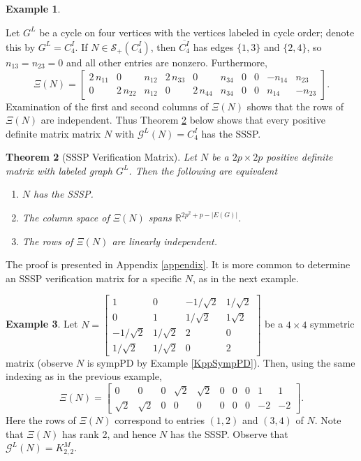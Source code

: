 \documentclass[12pt]{article}
\newtheorem{thm}{Theorem}[section]
\theoremstyle{definition}
\theoremstyle{definition}
\theoremstyle{definition}
\newtheorem{ex}[thm]{Example}
\numberwithin{figure}{section}
\numberwithin{equation}{section}
\newcommand{\G}{\mathcal{G}}
\newcommand{\symp}{\mathcal{S}_+}
\newcommand{\ben}{\begin{enumerate}}
\newcommand{\een}{\end{enumerate}}
\newcommand{\beq}{\begin{equation}}
\newcommand{\eeq}{\end{equation}}
\newcommand{\OL}{\overline}
\begin{document}
\begin{ex}\label{ex:verify-cycle}

 Let $G^L$ be a cycle on four vertices  with the vertices labeled in cycle order; 
denote this by $G^L=C_4^I$. If $N\in\symp(C_4^I)$, then $\OL{C_4^I}$ has edges $\{1,3\}$  and $\{2,4\}$, so $n_{13}=n_{23}=0$ and all other entries are nonzero. Furthermore, 
\beq\label{eq:P4SSSP}
\Xi(N)=
\left[\begin{array}{cccccccccc}
2 \, n_{11} & 0 & n_{12} & 2 \, n_{33} & 0 & n_{34} & 0 & 0 & -n_{14} & n_{23} \\
0 & 2 \, n_{22} & n_{12} & 0 & 2 \, n_{44} & n_{34} & 0 & 0 & n_{14} & -n_{23} 
\end{array}\right].
\eeq
Examination of the {first and second} columns of $\Xi(N)$ shows  that the rows of $\Xi(N)$ are independent.  Thus Theorem \ref{t:verification} below shows that every positive definite matrix matrix $N$ with $\G^L(N)=C_4^I$ has the SSSP.
\end{ex}
\begin{thm} [{SSSP Verification Matrix}]
\label{t:verification}
Let $N$ be a $2p\times 2p$ positive definite matrix with labeled graph $G^L$. 
Then the following are equivalent
\ben[$(a)$]
\item \label{a:verification} $N$ has the SSSP.
\item \label{b:verification} 
The column space of $\Xi(N)$ spans $\mathbb{R}^{2p^2+p -|E(G)|}$.
\item \label{c:verification} The rows of $\Xi(N)$ are linearly independent. 
\een
\end{thm} 

 The proof is presented in Appendix \ref{appendix}. 
 It is more common to determine an SSSP verification matrix for a specific $N$, as in the next example.

\begin{ex}\label{KppSympPD-SSSP} 
Let 
$N=
\begin{bmatrix}
    1 & 0 & -1/\sqrt{2} & 1/\sqrt{2} \\0 & 1 & 1/\sqrt{2} & 1\sqrt{2} \\-1/\sqrt{2} & 1/\sqrt{2} & 2 & 0 \\1/\sqrt{2} & 1/\sqrt{2} & 0 & 2
\end{bmatrix}$
be  a $4\times 4$ symmetric matrix (observe $N$ is sympPD by Example \ref{KppSympPD}). 
 Then, using the same indexing as in the previous example,  
\[ \Xi(N)=\left[\begin{array}{rrrrrrrrrr}
0 & 0 & 0 & \sqrt 2 & \sqrt 2 & 0 & 0 & 0 & 1 & { 1} 
\\
\sqrt 2 & \sqrt 2 & 0 & 0 & 0 & 0 & 0 & 0 & -2 & -2 
\end{array}\right].
\] 
Here the rows of $\Xi(N)$ correspond to 
entries $(1,2)$ and $(3,4)$ of $N$.
Note that $\Xi(N)$ has rank 2, and hence $N$ has the SSSP.   Observe that $\G^L(N)=K_{2,2}^M$. 
\end{ex}
\end{document}
